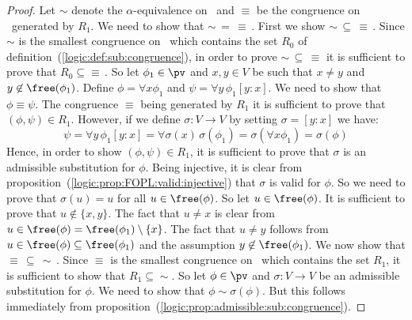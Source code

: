 \noindent
\begin{proof}
Let $\sim$ denote the $\alpha$-equivalence on \pv\ and $\equiv$
be the congruence on \pv\ generated by $R_{1}$. We need to show that
$\sim\,=\,\equiv\,$. First we show $\sim\,\subseteq\,\equiv\,$.
Since $\sim$ is the smallest congruence on \pv\ which contains the
set $R_{0}$ of definition~(\ref{logic:def:sub:congruence}), in order
to prove $\sim\,\subseteq\,\equiv$ it is sufficient to prove that
$R_{0}\subseteq\equiv\,$. So let $\phi_{1}\in\pv$ and $x,y\in V$ be
such that $x\neq y$ and $y\not\in\free(\phi_{1})$. Define
$\phi=\forall x\phi_{1}$ and $\psi=\forall y\,\phi_{1}[y\!:\!x]$. We
need to show that $\phi\equiv\psi$. The congruence $\equiv$ being
generated by $R_{1}$ it is sufficient to prove that $(\phi,\psi)\in
R_{1}$. However, if we define $\sigma:V\to V$ by setting
$\sigma=[y\!:\!x]$ we have:
    \[
    \psi=\forall
    y\,\phi_{1}[y\!:\!x]=\forall\sigma(x)\,\sigma(\phi_{1})=\sigma(\forall
    x\phi_{1})=\sigma(\phi)
    \]
Hence, in order to show $(\phi,\psi)\in R_{1}$, it is sufficient to
prove that $\sigma$ is an admissible substitution for $\phi$. Being
injective, it is clear from
proposition~(\ref{logic:prop:FOPL:valid:injective}) that $\sigma$ is
valid for $\phi$. So we need to prove that $\sigma(u)=u$ for all
$u\in\free(\phi)$. So let $u\in\free(\phi)$. It is sufficient to
prove that $u\not\in\{x,y\}$. The fact that $u\neq x$ is clear from
$u\in\free(\phi)=\free(\phi_{1})\setminus\{x\}$. The fact that
$u\neq y$ follows from $u\in\free(\phi)\subseteq\free(\phi_{1})$ and
the assumption $y\not\in\free(\phi_{1})$. We now show that
$\equiv\,\subseteq\,\sim\,$. Since $\equiv$ is the smallest
congruence on \pv\ which contains the set $R_{1}$, it is sufficient
to show that $R_{1}\subseteq\sim$. So let $\phi\in\pv$ and
$\sigma:V\to V$ be an admissible substitution for $\phi$. We need to
show that $\phi\sim\sigma(\phi)$. But this follows immediately from
proposition~(\ref{logic:prop:admissible:sub:congruence}).
\end{proof}
